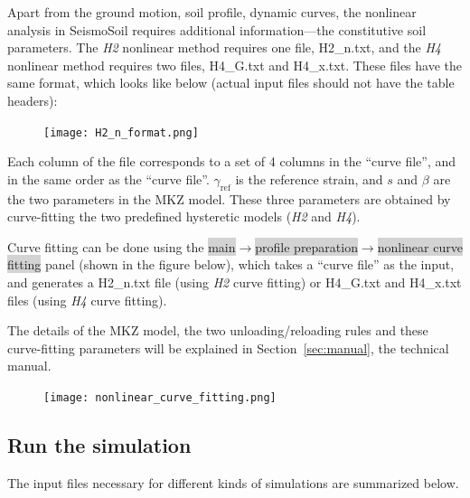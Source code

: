 \documentclass[11pt,letterpaper]{article}
\newcommand{\panel}[1]{\colorbox{lightgray}{\textsf{#1}}}
\begin{document}
Apart from the ground motion, soil profile, dynamic curves, the nonlinear analysis in SeismoSoil requires additional information---the constitutive soil parameters. The \emph{H2} nonlinear method requires one file, \textsf{H2\_n.txt}, and the \emph{H4} nonlinear method requires two files, \textsf{H4\_G.txt} and \textsf{H4\_x.txt}.  These files have the same format, which looks like below (actual input files should not have the table headers):

\begin{figure}[H]
\centering
  \texttt{[image: H2\_n\_format.png]}\\
\end{figure}

Each column of the file corresponds to a set of 4 columns in the ``curve file'', and in the same order as the ``curve file''. $\gamma_{\text{ref}}$ is the reference strain, and $s$ and $\beta$ are the two parameters in the MKZ model. These three parameters are obtained by curve-fitting the two predefined hysteretic models (\emph{H2} and \emph{H4}).

Curve fitting can be done using the \panel{main}$\rightarrow$\panel{profile preparation}$\rightarrow$\panel{nonlinear curve fitting} panel (shown in the figure below), which takes a ``curve file'' as the input, and generates a \textsf{H2\_n.txt} file (using \emph{H2} curve fitting) or \textsf{H4\_G.txt} and \textsf{H4\_x.txt} files (using \emph{H4} curve fitting).

The details of the MKZ model, the two unloading/reloading rules and these curve-fitting parameters will be explained in Section~\ref{sec:manual}, the technical manual.


\begin{figure}[H]
\centering
  \texttt{[image: nonlinear\_curve\_fitting.png]}\\
\end{figure}


\newpage
\subsection{Run the simulation}

The input files necessary for different kinds of simulations are summarized below.
\end{document}
